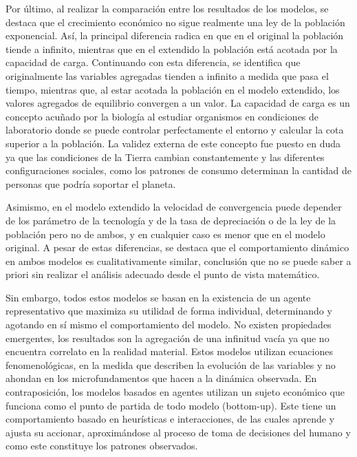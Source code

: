 \documentclass[10pt]{article}
\begin{document}
Por último, al realizar la comparación entre los resultados de los modelos, se destaca que el crecimiento económico no sigue realmente una ley de la población exponencial. Así, la principal diferencia radica en que en el original la población tiende a infinito, mientras que en el extendido la población está acotada por la capacidad de carga. Continuando con esta diferencia, se identifica que originalmente las variables agregadas tienden a infinito a medida que pasa el tiempo, mientras que, al estar acotada la población en el modelo extendido, los valores agregados de equilibrio convergen a un valor. La capacidad de carga es un concepto acuñado por la biología al estudiar organismos en condiciones de laboratorio donde se puede controlar perfectamente el entorno y calcular la cota superior a la población. La validez externa de este concepto fue puesto en duda ya que las condiciones de la Tierra cambian constantemente y las diferentes configuraciones sociales, como los patrones de consumo determinan la cantidad de personas que podría soportar el planeta.

Asimismo, en el modelo extendido la velocidad de convergencia puede depender de los parámetro de la tecnología y de la tasa de depreciación o de la ley de la población pero no de ambos, y en cualquier caso es menor que en el modelo original. A pesar de estas diferencias, se destaca que el comportamiento dinámico en ambos modelos es cualitativamente similar, conclusión que no se puede saber a priori sin realizar el análisis adecuado desde el punto de vista matemático.

Sin embargo, todos estos modelos se basan en la existencia de un agente representativo que maximiza su utilidad de forma individual, determinando y agotando en sí mismo el comportamiento del modelo. No existen propiedades emergentes, los resultados son la agregación de una infinitud vacía ya que no encuentra correlato en la realidad material. Estos modelos utilizan ecuaciones fenomenológicas, en la medida que describen la evolución de las variables y no ahondan en los microfundamentos que hacen a la dinámica observada.  En contraposición, los modelos basados en agentes utilizan un sujeto económico que funciona como el punto de partida de todo modelo (bottom-up). Este tiene un comportamiento basado en heurísticas e interacciones, de las cuales aprende y ajusta su accionar, aproximándose al proceso de toma de decisiones del humano y como este constituye los patrones observados. 
\end{document}

